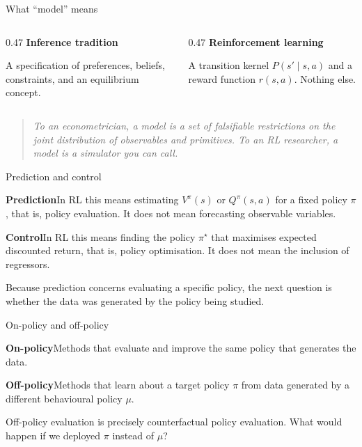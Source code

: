 \begin{frame}{What ``model'' means}

\begin{columns}[T]
\begin{column}{0.47\textwidth}
\textcolor{rlblue}{\textbf{Inference tradition}}

\medskip
A specification of preferences, beliefs, constraints, and an equilibrium concept.
\end{column}
\begin{column}{0.47\textwidth}
\textcolor{rlorange}{\textbf{Reinforcement learning}}

\medskip
A transition kernel $P(s' \mid s,a)$ and a reward function $r(s,a)$. Nothing else.
\end{column}
\end{columns}

\bigskip
\bigskip
\begin{quote}
\itshape
To an econometrician, a model is a set of falsifiable restrictions on the joint
distribution of observables and primitives. To an RL researcher, a model is a
simulator you can call.
\end{quote}
\end{frame}

\begin{frame}{Prediction and control}

\textbf{\textcolor{rlblue}{Prediction}}\quad In RL this means estimating $V^\pi(s)$
or $Q^\pi(s,a)$ for a fixed policy $\pi$, that is, policy evaluation. It does not
mean forecasting observable variables.

\bigskip
\textbf{\textcolor{rlblue}{Control}}\quad In RL this means finding the policy
$\pi^\star$ that maximises expected discounted return, that is, policy
optimisation. It does not mean the inclusion of regressors.

\bigskip
Because prediction concerns evaluating a specific policy, the next question is
whether the data was generated by the policy being studied.
\end{frame}

\begin{frame}{On-policy and off-policy}

\textbf{\textcolor{rlblue}{On-policy}}\quad Methods that evaluate and improve the
same policy that generates the data.

\bigskip
\textbf{\textcolor{rlblue}{Off-policy}}\quad Methods that learn about a target
policy $\pi$ from data generated by a different behavioural policy $\mu$.

\bigskip
Off-policy evaluation is precisely counterfactual policy evaluation. What would
happen if we deployed $\pi$ instead of $\mu$?
\end{frame}

